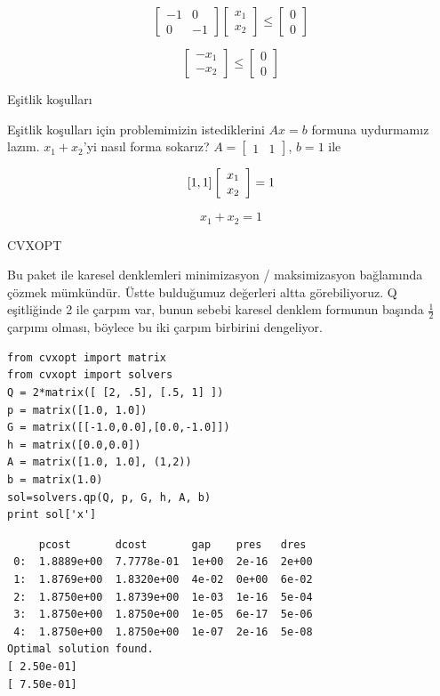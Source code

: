 \documentclass[12pt,fleqn]{article}\usepackage{../../common}
\begin{document}
$$ 
\left[ \begin{array}{cc}
-1 & 0 \\  0 & -1
\end{array} \right]
\left[ \begin{array}{c}
 x_1 \\ x_2
\end{array} \right]
\leq
\left[ \begin{array}{c}
0 \\  0
\end{array} \right]
$$

$$ 
\left[ \begin{array}{c}
-x_1 \\  -x_2
\end{array} \right]
\leq
\left[ \begin{array}{c}
 0 \\  0
\end{array} \right]
$$

Eşitlik koşulları

Eşitlik koşulları için problemimizin istediklerini $Ax = b$ formuna uydurmamız
lazım. $x_1 + x_2$'yi nasıl forma sokarız? $
A = \left[\begin{array}{cc} 1 & 1 \end{array}\right]$, $b = 1$ ile

$$ 
[1, 1] \left[ \begin{array}{c}
x_1 \\  x_2
\end{array} \right] 
= 1 \\
$$

$$ x_1 + x_2 = 1 $$

CVXOPT

Bu paket ile karesel denklemleri minimizasyon / maksimizasyon bağlamında çözmek
mümkündür. Üstte bulduğumuz değerleri altta görebiliyoruz. Q eşitliğinde 2 ile
çarpım var, bunun sebebi karesel denklem formunun başında $\frac{1}{2}$ çarpımı
olması, böylece bu iki çarpım birbirini dengeliyor.

\begin{verbatim}
from cvxopt import matrix
from cvxopt import solvers
Q = 2*matrix([ [2, .5], [.5, 1] ])
p = matrix([1.0, 1.0])
G = matrix([[-1.0,0.0],[0.0,-1.0]])
h = matrix([0.0,0.0])
A = matrix([1.0, 1.0], (1,2))
b = matrix(1.0)
sol=solvers.qp(Q, p, G, h, A, b)
print sol['x']
\end{verbatim}

\begin{verbatim}
     pcost       dcost       gap    pres   dres
 0:  1.8889e+00  7.7778e-01  1e+00  2e-16  2e+00
 1:  1.8769e+00  1.8320e+00  4e-02  0e+00  6e-02
 2:  1.8750e+00  1.8739e+00  1e-03  1e-16  5e-04
 3:  1.8750e+00  1.8750e+00  1e-05  6e-17  5e-06
 4:  1.8750e+00  1.8750e+00  1e-07  2e-16  5e-08
Optimal solution found.
[ 2.50e-01]
[ 7.50e-01]

\end{verbatim}
\end{document}
